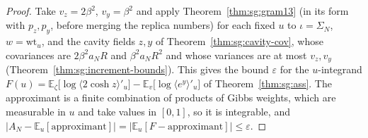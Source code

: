 \begin{proof}
  \leanok
Take $v_z=2\beta^2$, $v_y=\beta^2$ and apply Theorem~\ref{thm:sg:gram13} (in its form with $p_z,p_y$, before merging the replica numbers) for each fixed $u$ to $\iota=\Sigma_N$, $w=\mathrm{wt}_u$, and the cavity fields
$z,y$ of Theorem~\ref{thm:sg:cavity-cov}, whose covariances are $2\beta^2a_NR$ and $\beta^2a_NR^2$ and whose variances are at most $v_z,v_y$ (Theorem~\ref{thm:sg:increment-bounds}). This gives the bound $\varepsilon$ for the $u$-integrand
$F(u)=\mathbb E_\zeta\big[\log\langle2\cosh z\rangle'_u\big]-\mathbb E_v\big[\log\langle e^y\rangle'_u\big]$ of Theorem~\ref{thm:sg:ass}. The approximant is a finite combination of products of Gibbs weights, which are measurable in $u$ and take values in $[0,1]$,
so it is integrable, and $|A_N-\mathbb E_u[\mathrm{approximant}]|=|\mathbb E_u[F-\mathrm{approximant}]|\le\varepsilon$.
\end{proof}

